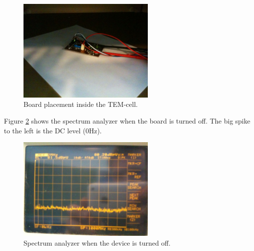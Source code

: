 \begin{figure}[H]
	\begin{centering}
		 \includegraphics[width=0.6\textwidth]{images/board_placement.jpg}
		\caption{Board placement inside the TEM-cell.}
		\label{fig:board_placement_TEM}
	\end{centering}
\end{figure}
Figure \ref{fig:spectrum_off} shows the spectrum analyzer when the board is turned off. The big spike to the left is the DC level (0Hz).
\begin{figure}[H]
	\begin{centering}
		 \includegraphics[width=0.6\textwidth]{images/measure_off.jpg}
		\caption{Spectrum analyzer when the device is turned off.}
		\label{fig:spectrum_off}
	\end{centering}
\end{figure}

